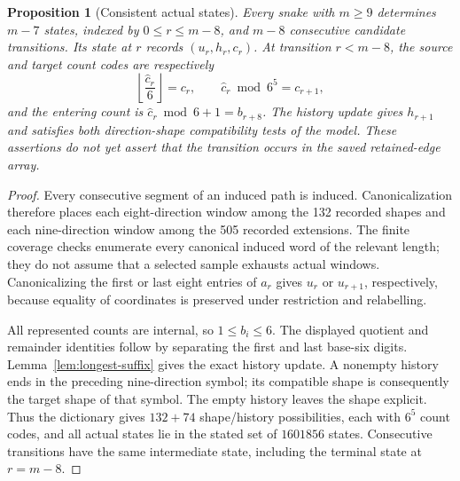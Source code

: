 \documentclass[11pt,a4paper]{article}
\newtheorem{proposition}[theorem]{Proposition}
\theoremstyle{definition}
\theoremstyle{remark}
\begin{document}
\begin{proposition}[Consistent actual states]\label{prop:actual-state-sequence}
Every snake with $m\ge9$ determines $m-7$ states, indexed by
$0\le r\le m-8$, and $m-8$ consecutive candidate transitions. Its state at
$r$ records $(u_r,h_r,c_r)$. At transition $r<m-8$, the source and target
count codes are respectively
\[
\left\lfloor\frac{\widehat c_r}{6}\right\rfloor=c_r,
\qquad \widehat c_r\bmod6^5=c_{r+1},
\]
and the entering count is $\widehat c_r\bmod6+1=b_{r+8}$.
The history update gives $h_{r+1}$ and satisfies both direction-shape
compatibility tests of the model. These assertions do not yet assert that
the transition occurs in the saved retained-edge array.
\end{proposition}
\begin{proof}
Every consecutive segment of an induced path is induced. Canonicalization
therefore places each eight-direction window among the 132 recorded shapes
and each nine-direction window among the 505 recorded extensions. The finite
coverage checks enumerate every canonical induced word of the relevant
length; they do not assume that a selected sample exhausts actual windows.
Canonicalizing the first or last eight entries of $a_r$ gives $u_r$ or
$u_{r+1}$, respectively, because equality of coordinates is preserved under
restriction and relabelling.

All represented counts are internal, so $1\le b_i\le6$. The displayed
quotient and remainder identities follow by separating the first and last
base-six digits. Lemma~\ref{lem:longest-suffix} gives the exact history
update. A nonempty history ends in the preceding nine-direction symbol;
its compatible shape is consequently the target shape of that symbol.
The empty history leaves the shape explicit. Thus the dictionary gives
$132+74$ shape/history possibilities, each with $6^5$ count codes, and all
actual states lie in the stated set of $1601856$ states. Consecutive
transitions have the same intermediate state, including the terminal state
at $r=m-8$.
\end{proof}
\end{document}
